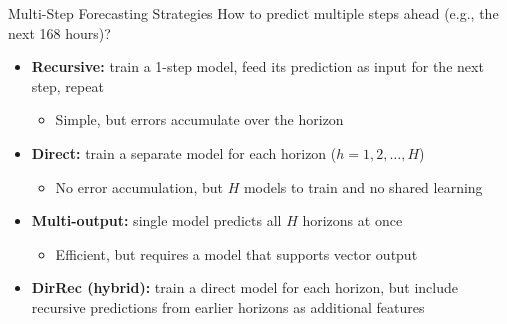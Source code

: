 \documentclass[11pt,compress,t,notes=noshow, xcolor=table]{beamer}
\begin{document}
\begin{vbframe}{Multi-Step Forecasting Strategies}
\vfill
How to predict multiple steps ahead (e.g., the next 168 hours)?
\vfill
\begin{itemize}
    \item \textbf{Recursive:} train a 1-step model, feed its prediction as input for the next step, repeat
    \begin{itemize}
        \item Simple, but errors accumulate over the horizon
    \end{itemize}
    \item \textbf{Direct:} train a separate model for each horizon ($h=1, 2, \ldots, H$)
    \begin{itemize}
        \item No error accumulation, but $H$ models to train and no shared learning
    \end{itemize}
    \item \textbf{Multi-output:} single model predicts all $H$ horizons at once
    \begin{itemize}
        \item Efficient, but requires a model that supports vector output
    \end{itemize}
    \item \textbf{DirRec (hybrid):} train a direct model for each horizon, but include recursive predictions from earlier horizons as additional features
\end{itemize}
\vfill
\end{vbframe}


\endlecture
\end{document}
